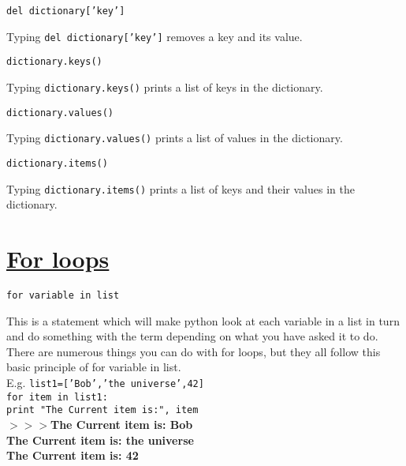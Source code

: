 \noindent \texttt{del dictionary['key']}
\begin{myindentpar}{1.4cm}
\vspace*{-1ex}
Typing \texttt{del dictionary['key']} removes a key and its value.
\end{myindentpar}

\noindent \texttt{dictionary.keys()}
\begin{myindentpar}{1.4cm}
\vspace*{-1ex}
Typing \texttt{dictionary.keys()} prints a list of keys in the dictionary.
\end{myindentpar}

\noindent \texttt{dictionary.values()}
\begin{myindentpar}{1.4cm}
\vspace*{-1ex}
Typing \texttt{dictionary.values()} prints a list of values in the dictionary.
\end{myindentpar}


\noindent \texttt{dictionary.items()}
\begin{myindentpar}{1.4cm}
\vspace*{-1ex}
Typing \texttt{dictionary.items()} prints a list of keys and their values in the dictionary.
\end{myindentpar}


\newpage

\section*{\underline{For loops}}
\noindent \texttt{for variable in list}
\begin{myindentpar}{1.4cm}
\vspace*{-1ex}
This is a statement which will make python look at each variable in a list in turn and do something with the term depending on what you have asked it to do. There are numerous things you can do with for loops, but they all follow this basic principle of for variable in list.\\
E.g. \texttt{list1=['Bob','the universe',42]\\
{\color{orange}for} item {\color{orange}in} list1:\\
\phantom{tab} {\color{purple}print} "The Current item is:", item}\\
\textbf{$>>>$The Current item is: Bob\\
\phantom{$>>>$}The Current item is: the universe\\
\phantom{$>>>$}The Current item is: 42}
\end{myindentpar}

